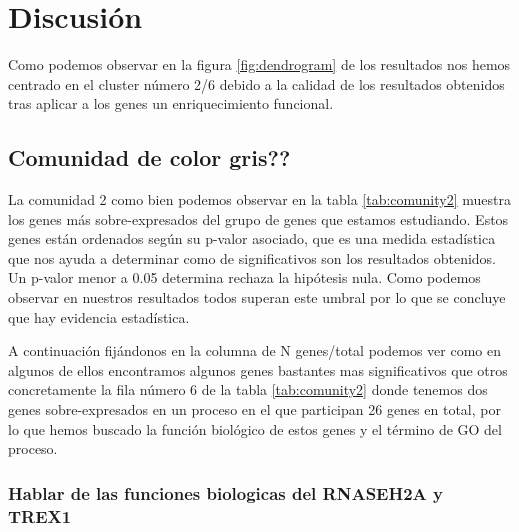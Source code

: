 \section{Discusión}

Como podemos observar en la figura \ref{fig:dendrogram} de los resultados nos hemos centrado en el cluster número 2/6 debido a la calidad de los resultados obtenidos tras aplicar a los genes un enriquecimiento funcional. 

\subsection{Comunidad de color gris??}

La comunidad 2 como bien podemos observar en la tabla \ref{tab:comunity2} muestra los genes más sobre-expresados del grupo de genes que estamos estudiando. Estos genes están ordenados según su p-valor asociado, que es una medida estadística que nos ayuda a determinar como de significativos son los resultados obtenidos. Un p-valor menor a 0.05 determina rechaza la hipótesis nula. Como podemos observar en nuestros resultados todos superan este umbral por lo que se concluye que hay evidencia estadística. 

A continuación fijándonos en la columna de N genes/total podemos ver como en algunos de ellos encontramos algunos genes bastantes mas significativos que otros concretamente la fila número 6 de la tabla \ref{tab:comunity2} donde tenemos dos genes sobre-expresados en un proceso en el que participan 26 genes en total, por lo que hemos buscado la función biológico de estos genes y el término de GO del proceso.

\subsubsection{\textbf{Hablar de las funciones biologicas del RNASEH2A y TREX1} }